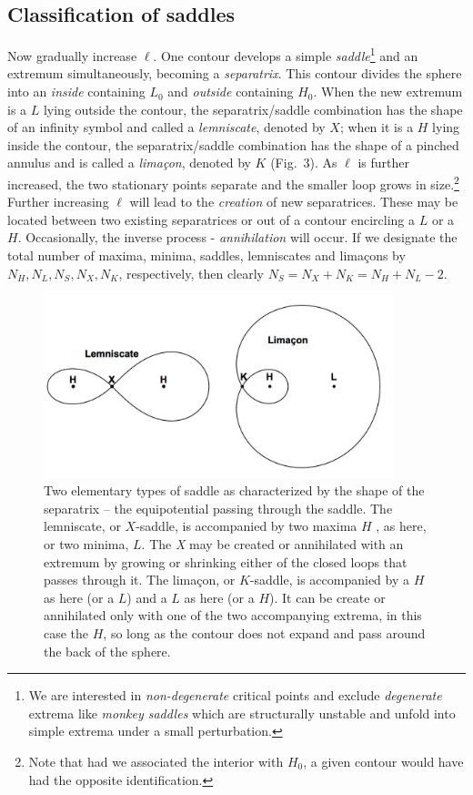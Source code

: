 \documentclass[12pt]{article}
\begin{document}
\subsection{Classification of saddles}
Now gradually increase $\ell$. One contour develops a simple \emph{saddle}\footnote{We are interested in \emph{non-degenerate} critical points and exclude \emph{degenerate} extrema like \emph{monkey saddles} which are structurally unstable and unfold into simple extrema under a small perturbation.} and an extremum simultaneously, becoming a \emph{separatrix}. This contour divides the sphere into an \emph{inside} containing $L_0$ and \emph{outside} containing $H_0$. When the new extremum is a $L$ lying outside the contour, the separatrix/saddle combination has the shape of an infinity symbol and called a \emph{lemniscate}, denoted by $X$; when it is a $H$ lying inside the contour, the separatrix/saddle combination has the shape of a pinched annulus and is called a \emph{lima\c con}, denoted by $K$ (Fig.~3). As $\ell$ is further increased, the two stationary points separate and the smaller loop grows in size.\footnote{Note that had we associated the interior with $H_0$, a given contour would have had the opposite identification.} Further increasing $\ell$ will lead to the \emph{creation} of new separatrices. These may be located between two existing separatrices or out of a contour encircling a $L$ or a $H$.  Occasionally, the inverse process - \emph{annihilation} will occur. If we designate the total  number of maxima, minima, saddles, lemniscates and lima\c cons by $N_H,N_L,N_S,N_X,N_K$, respectively, then clearly $N_S=N_X+N_K=N_H+N_L-2$.

\begin{figure}[h!]
\centering
\includegraphics[width=4in]{fig3.jpg}
\caption{Two elementary types of saddle as characterized by the shape of the separatrix -- the equipotential passing through the saddle. The lemniscate, or $X$-saddle, is accompanied by two maxima $H$ , as here, or two minima, $L$. The \emph X may be created or annihilated with an extremum by growing or shrinking either of the closed loops that passes through it. The lima\c con, or $K$-saddle, is accompanied by a $H$ as here (or a $L$) and a $L$ as here (or a $H$). It can be create or annihilated only with one of the two accompanying extrema, in this case the $H$, so long as the contour does not expand and pass around the back of the sphere.}
\end{figure}
\end{document}
